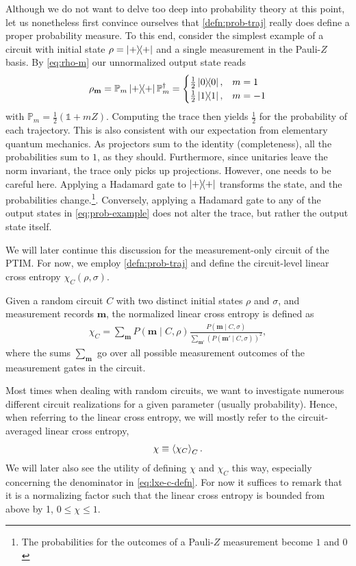 Although we do not want to delve too deep into probability theory at this point,
let us nonetheless first convince ourselves that \cref{defn:prob-traj} really does
define a proper probability measure. To this end, consider the simplest example of
a circuit with initial state $\rho = \dyad{+}$ and a single measurement in the
Pauli-$Z$ basis. By \cref{eq:rho-m} our unnormalized output state reads
\begin{align}\label{eq:prob-example}
  \rho_\mathbf{m} = \mathbb{P}_m \dyad{+} \mathbb{P}_m^\dagger = \begin{cases}
    \frac{1}{2}\dyad{0}, & m = 1 \\
    \frac{1}{2}\dyad{1}, & m = -1
  \end{cases}
\end{align}
with $\mathbb{P}_m = \frac{1}{2}\left(\mathds{1} + m Z \right)$. Computing the
trace then yields $\frac{1}{2}$ for the probability of each trajectory. This is
also consistent with our expectation from elementary quantum mechanics. As
projectors sum to the identity (completeness), all the probabilities sum to
$1$, as they should.
Furthermore, since unitaries leave the norm invariant, the trace only picks up
projections. However, one needs to be careful here. Applying a Hadamard gate to
$\dyad{+}$ transforms the state, and the probabilities change.\footnote{The
  probabilities for the outcomes of a Pauli-$Z$ measurement become $1$ and
$0$}. Conversely,
applying a Hadamard gate to any of the output states in \cref{eq:prob-example}
does not alter the trace, but rather the output state itself.

We will later continue this discussion for the measurement-only circuit of the
PTIM. For now, we employ \cref{defn:prob-traj} and define the circuit-level
linear cross entropy $\chi_C\left(\rho, \sigma  \right)$.

\begin{defn}\label{defn:lxe}
  Given a random circuit $C$ with two distinct initial states $\rho$ and
  $\sigma$, and measurement records $\mathbf{m}$, the normalized linear cross
  entropy is defined as
  \begin{align}\label{eq:lxe-c-defn}
    \chi_C = \sum_{\mathbf{m}} P(\mathbf{m} \mid C, \rho) \frac{P(\mathbf{m} \mid
      C, \sigma)}{\sum_{\mathbf{m}'}\left(P(\mathbf{m}' \mid
      C, \sigma)\right)^2}
  ,\end{align}
  where the sums $\sum_\mathbf{m}$ go over all possible measurement outcomes of
  the measurement gates in the circuit.
\end{defn}
Most times when dealing with random circuits, we want to investigate numerous
different circuit realizations for a given parameter (usually probability).
Hence, when referring to the linear cross entropy, we will mostly refer to the
circuit-averaged linear cross entropy,
\begin{align}
  \chi \equiv \expval{\chi_C}_C
.\end{align}
We will later also see the utility of defining $\chi$ and $\chi_C$ this way,
especially concerning the denominator in \cref{eq:lxe-c-defn}. For now it
suffices to remark that it is a normalizing factor such that the linear cross
entropy is bounded from above by 1, $0 \leq \chi \leq 1$.


